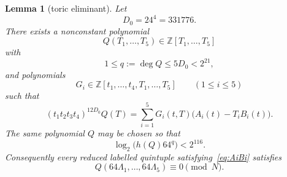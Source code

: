 \documentclass[10pt,a4paper]{amsart}
\newtheorem{lemma}{Lemma}
\newcommand{\Z}{\mathbb Z}
\begin{document}
\begin{lemma}[toric eliminant]\label{lem:toric}
Let
\[
 D_0=24^4=331776.
\]
There exists a nonconstant polynomial
\[
 Q(T_1,\ldots,T_5)\in\Z[T_1,\ldots,T_5]
\]
with
\begin{equation}\label{eq:Q-degree}
 1\le q:=\deg Q\le5D_0<2^{21},
\end{equation}
and polynomials
\[
 G_i\in\Z[t_1,\ldots,t_4,T_1,\ldots,T_5]\qquad(1\le i\le5)
\]
such that
\begin{equation}\label{eq:toric-certificate}
 (t_1t_2t_3t_4)^{12D_0}Q(T)
 =\sum_{i=1}^5G_i(t,T)\bigl(A_i(t)-T_iB_i(t)\bigr).
\end{equation}
The same polynomial $Q$ may be chosen so that
\begin{equation}\label{eq:Q-height-combined}
 \log_2 \bigl(h(Q)64^q\bigr)<2^{116}.
\end{equation}
Consequently every reduced labelled quintuple satisfying~\eqref{eq:AiBi}
satisfies
\begin{equation}\label{eq:Q-cong}
 Q(64\Lambda_1,\ldots,64\Lambda_5)\equiv0\pmod N.
\end{equation}
\end{lemma}
\end{document}
